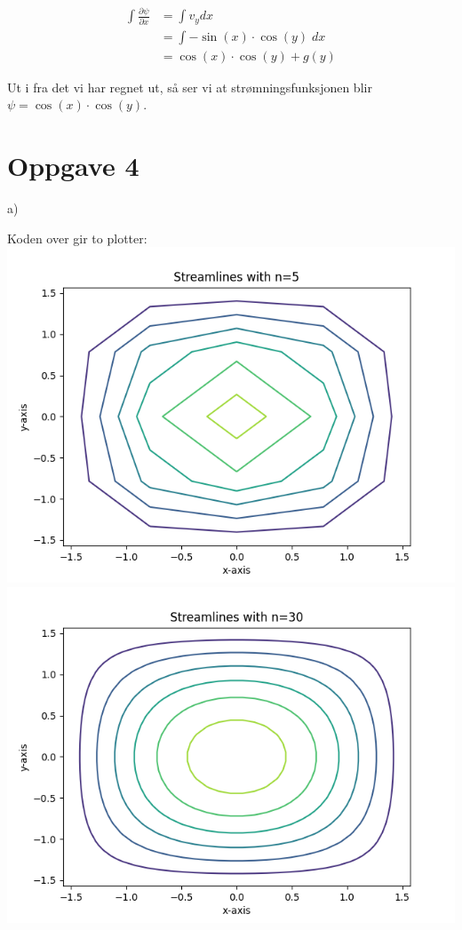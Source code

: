 \documentclass[12pt, a4paper]{article}
\begin{document}
\begin{equation}
    \begin{split}
        \int \frac{\partial \psi}{\partial x} &= \int v_y dx \\
                                              &= \int -\sin(x) \cdot \cos(y) \; dx \\
                                              &= \cos(x) \cdot \cos(y) + g(y)
    \end{split}
\end{equation}

Ut i fra det vi har regnet ut, så ser vi at strømningsfunksjonen blir $\psi = \cos(x) \cdot \cos(y)$.



\newpage
\section*{Oppgave 4}

a)

Koden over gir to plotter: \\
\hspace*{-1.5cm}
\includegraphics[scale=0.5]{strlin_5}
\includegraphics[scale=0.5]{strlin_30}\\
\end{document}
